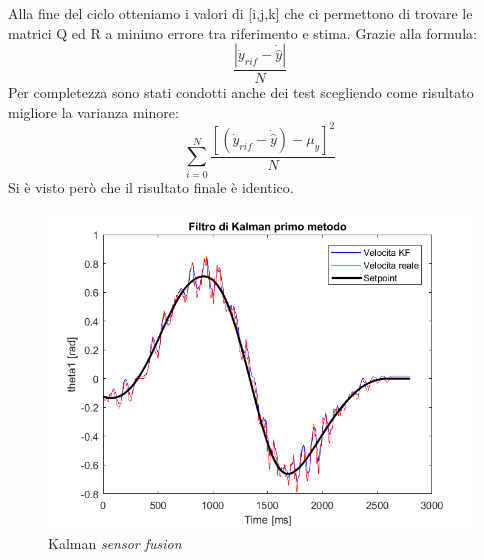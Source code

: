 Alla fine del ciclo otteniamo i valori di [i,j,k] che ci permettono di trovare le matrici Q ed R a minimo errore tra riferimento e stima. Grazie alla formula:
\begin{equation}
\frac{|\dot{y}_{rif}-\dot{\hat{y}}|}{N}
\end{equation} 
Per completezza sono stati condotti anche dei test scegliendo come risultato migliore la varianza minore:
\begin{equation}
\sum_{i=0}^{N} \frac{[(\dot{y}_{rif}-\dot{\hat{y}}) - \mu_y]^2}{N}
\end{equation}
Si è visto però che il risultato finale è identico.
\begin{figure}[ht]
	\begin{center}
		\includegraphics[scale=0.52]{Immagini/Kalman1}
		\caption{Kalman \textit{sensor fusion}}
		\label{fig:kalman}
	\end{center}
\end{figure}
